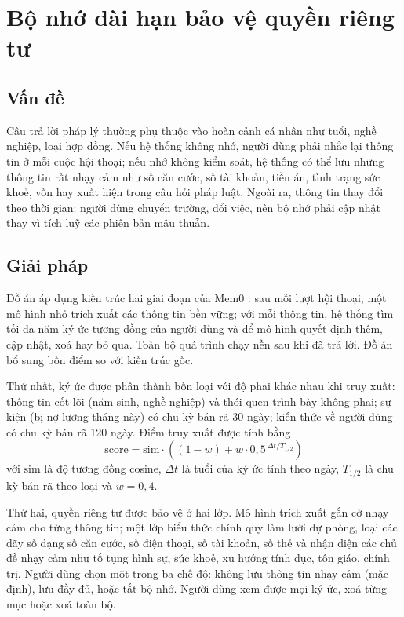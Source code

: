 \documentclass[../DoAn.tex]{subfiles}
\begin{document}
\section{Bộ nhớ dài hạn bảo vệ quyền riêng tư}
\label{section:5.4}

\subsection{Vấn đề}
Câu trả lời pháp lý thường phụ thuộc vào hoàn cảnh cá nhân như tuổi, nghề nghiệp, loại hợp đồng. Nếu hệ thống không nhớ, người dùng phải nhắc lại thông tin ở mỗi cuộc hội thoại; nếu nhớ không kiểm soát, hệ thống có thể lưu những thông tin rất nhạy cảm như số căn cước, số tài khoản, tiền án, tình trạng sức khoẻ, vốn hay xuất hiện trong câu hỏi pháp luật. Ngoài ra, thông tin thay đổi theo thời gian: người dùng chuyển trường, đổi việc, nên bộ nhớ phải cập nhật thay vì tích luỹ các phiên bản mâu thuẫn.

\subsection{Giải pháp}
Đồ án áp dụng kiến trúc hai giai đoạn của Mem0 \cite{chhikara2025mem0}: sau mỗi lượt hội thoại, một mô hình nhỏ trích xuất các thông tin bền vững; với mỗi thông tin, hệ thống tìm tối đa năm ký ức tương đồng của người dùng và để mô hình quyết định thêm, cập nhật, xoá hay bỏ qua. Toàn bộ quá trình chạy nền sau khi đã trả lời. Đồ án bổ sung bốn điểm so với kiến trúc gốc.

Thứ nhất, ký ức được phân thành bốn loại với độ phai khác nhau khi truy xuất: thông tin cốt lõi (năm sinh, nghề nghiệp) và thói quen trình bày không phai; sự kiện (bị nợ lương tháng này) có chu kỳ bán rã 30 ngày; kiến thức về người dùng có chu kỳ bán rã 120 ngày. Điểm truy xuất được tính bằng
\begin{equation}\label{eq:memscore}
    \mathrm{score} = \mathrm{sim}\cdot\left((1-w) + w\cdot 0{,}5^{\,\Delta t / T_{1/2}}\right)
\end{equation}
với $\mathrm{sim}$ là độ tương đồng cosine, $\Delta t$ là tuổi của ký ức tính theo ngày, $T_{1/2}$ là chu kỳ bán rã theo loại và $w = 0{,}4$.

Thứ hai, quyền riêng tư được bảo vệ ở hai lớp. Mô hình trích xuất gắn cờ nhạy cảm cho từng thông tin; một lớp biểu thức chính quy làm lưới dự phòng, loại các dãy số dạng số căn cước, số điện thoại, số tài khoản, số thẻ và nhận diện các chủ đề nhạy cảm như tố tụng hình sự, sức khoẻ, xu hướng tính dục, tôn giáo, chính trị. Người dùng chọn một trong ba chế độ: không lưu thông tin nhạy cảm (mặc định), lưu đầy đủ, hoặc tắt bộ nhớ. Người dùng xem được mọi ký ức, xoá từng mục hoặc xoá toàn bộ.
\end{document}
